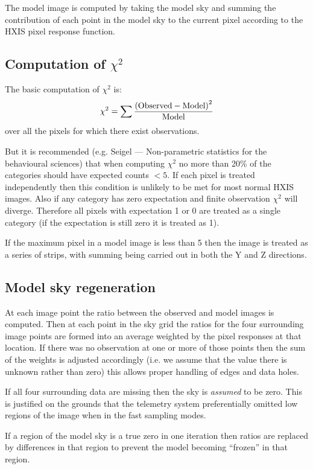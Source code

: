 The model image is computed by taking the model sky and summing the
contribution of each point in the model sky to the current pixel
according to the HXIS pixel response function.

\subsection{Computation of $\chi^2$}

The basic computation of $\chi^2$ is:
$$ \chi^2 = \sum {{\rm (Observed - Model)}^2\over {\rm Model}} $$
over all the pixels for which there exist observations.

But it is recommended (e.g. Seigel --- Non-parametric statistics 
for the behavioural
sciences) that when computing $\chi^2$ no more than 20\% of the categories
should have expected counts $< 5$. If each pixel is treated independently
then this condition is unlikely to be met for most normal HXIS images. Also
if any category has zero expectation and finite observation $\chi^2$ will
diverge. Therefore all pixels with expectation 1 or 0
are treated as a single category (if the expectation is still zero
it is treated as 1). 

If the maximum pixel in a model image is less than
5 then the image is treated as a series of strips, with summing being
carried out in both the Y and Z directions.

\subsection{Model sky regeneration}

At each image point the ratio between the observed and model images
is computed. Then
at each point in the sky grid the ratios for the four surrounding
image points are formed into an average weighted by the pixel responses at that
location.
If there was no observation at one or more of those points then the
sum of the weights is adjusted accordingly (i.e. we assume that the value
there is unknown rather than zero) this allows proper handling
of edges and data holes.

If all four surrounding data are missing then the sky is {\em assumed}
to be zero. This is justified on the grounds that the telemetry system
preferentially omitted low regions of the image when in the fast 
sampling modes.

If a region of the model sky is a true zero in one iteration then ratios are
replaced by differences in that region to prevent the model becoming ``frozen''
in that region.

